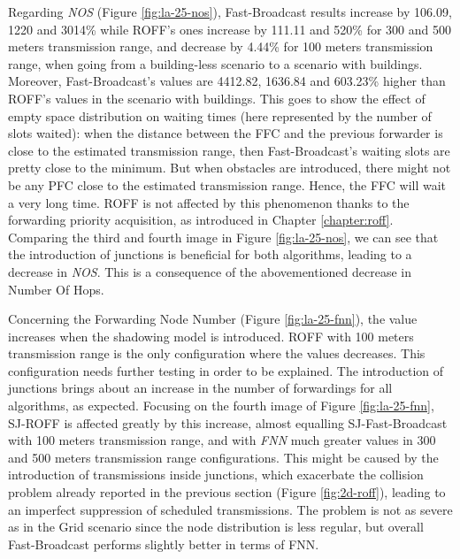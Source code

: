 		
		Regarding \textit{NOS} (Figure \ref{fig:la-25-nos}), Fast-Broadcast results increase by 106.09, 1220 and 3014\% while ROFF's ones increase by 111.11 and 520\% for 300 and 500 meters transmission range, and decrease by 4.44\% for 100 meters transmission range, when going from a building-less scenario to a scenario with buildings. Moreover, Fast-Broadcast's values are 4412.82, 1636.84 and 603.23\% higher than ROFF's values in the scenario with buildings. This goes to show the effect of empty space distribution on waiting times (here represented by the number of slots waited): when the distance between the FFC and the previous forwarder is close to the estimated transmission range, then Fast-Broadcast's waiting slots are pretty close to the minimum. But when obstacles are introduced, there might not be any PFC close to the estimated transmission range. Hence, the FFC will wait a very long time. ROFF is not affected by this phenomenon thanks to the forwarding priority acquisition, as introduced in Chapter \ref{chapter:roff}. Comparing the third and fourth image in Figure \ref{fig:la-25-nos}, we can see that the introduction of junctions is beneficial for both algorithms, leading to a decrease in \textit{NOS}. This is a consequence of the abovementioned decrease in Number Of Hops.
		
			
		Concerning the Forwarding Node Number (Figure \ref{fig:la-25-fnn}), the value increases when the shadowing model is introduced. ROFF with 100 meters transmission range is the only configuration where the values decreases. This configuration needs further testing in order to be explained.
		The introduction of junctions brings about an increase in the number of forwardings for all algorithms, as expected. Focusing on the fourth image of Figure \ref{fig:la-25-fnn}, SJ-ROFF is affected greatly by this increase, almost equalling SJ-Fast-Broadcast with 100 meters transmission range, and with \textit{FNN} much greater values in 300 and 500 meters transmission range configurations. This might be caused by the introduction of transmissions inside junctions, which exacerbate the collision problem already reported in the previous section (Figure \ref{fig:2d-roff}), leading to an imperfect suppression of scheduled transmissions. The problem is not as severe as in the Grid scenario since the node distribution is less regular, but overall Fast-Broadcast performs slightly better in terms of FNN.
	

